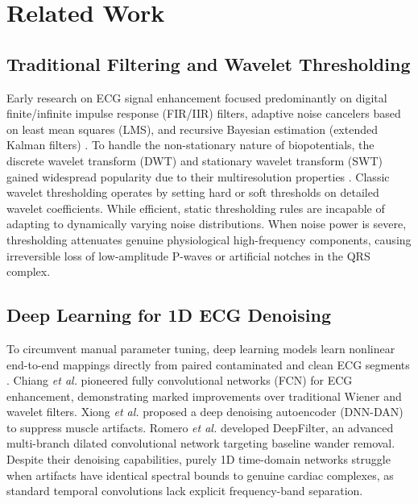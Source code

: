 \section{Related Work}
\label{sec:related}

\subsection{Traditional Filtering and Wavelet Thresholding}
Early research on ECG signal enhancement focused predominantly on digital finite/infinite impulse response (FIR/IIR) filters, adaptive noise cancelers based on least mean squares (LMS), and recursive Bayesian estimation (extended Kalman filters) \cite{clifford2006,goldberger2000}. To handle the non-stationary nature of biopotentials, the discrete wavelet transform (DWT) and stationary wavelet transform (SWT) gained widespread popularity due to their multiresolution properties \cite{clifford2006}. Classic wavelet thresholding operates by setting hard or soft thresholds on detailed wavelet coefficients. While efficient, static thresholding rules are incapable of adapting to dynamically varying noise distributions. When noise power is severe, thresholding attenuates genuine physiological high-frequency components, causing irreversible loss of low-amplitude P-waves or artificial notches in the QRS complex.

\subsection{Deep Learning for 1D ECG Denoising}
To circumvent manual parameter tuning, deep learning models learn nonlinear end-to-end mappings directly from paired contaminated and clean ECG segments \cite{vincent2008,chiang2019}. Chiang \emph{et al.} \cite{chiang2019} pioneered fully convolutional networks (FCN) for ECG enhancement, demonstrating marked improvements over traditional Wiener and wavelet filters. Xiong \emph{et al.} \cite{xiong2016} proposed a deep denoising autoencoder (DNN-DAN) to suppress muscle artifacts. Romero \emph{et al.} \cite{romero2021} developed DeepFilter, an advanced multi-branch dilated convolutional network targeting baseline wander removal. Despite their denoising capabilities, purely 1D time-domain networks struggle when artifacts have identical spectral bounds to genuine cardiac complexes, as standard temporal convolutions lack explicit frequency-band separation.


